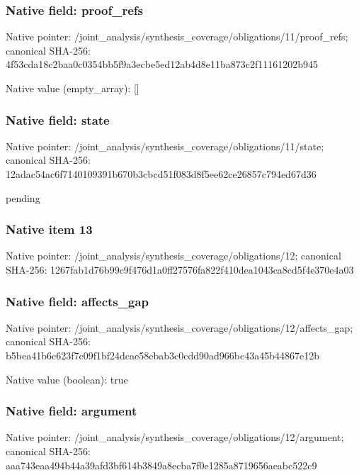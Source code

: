 \documentclass[10pt,a4paper]{article}
\begin{document}
\subsubsection{Native field: proof\_\allowbreak{}refs}
Native pointer: /joint\_\allowbreak{}analysis/synthesis\_\allowbreak{}coverage/obligations/11/proof\_\allowbreak{}refs; canonical SHA-256: 4f53cda18c2baa0c0354bb5f9a3ecbe5ed12ab4d8e11ba873c2f11161202b945

Native value (empty\_\allowbreak{}array): []

\subsubsection{Native field: state}
Native pointer: /joint\_\allowbreak{}analysis/synthesis\_\allowbreak{}coverage/obligations/11/state; canonical SHA-256: 12adac54ac6f7140109391b670b3cbcd51f083d8f5ee62ce26857c794ed67d36

\begingroup\raggedright\sloppy pending\par\endgroup

\subsubsection{Native item 13}
Native pointer: /joint\_\allowbreak{}analysis/synthesis\_\allowbreak{}coverage/obligations/12; canonical SHA-256: 1267fab1d76b99c9f476d1a0ff27576fa822f410dea1043ca8cd5f4e370e4a03

\subsubsection{Native field: affects\_\allowbreak{}gap}
Native pointer: /joint\_\allowbreak{}analysis/synthesis\_\allowbreak{}coverage/obligations/12/affects\_\allowbreak{}gap; canonical SHA-256: b5bea41b6c623f7c09f1bf24dcae58ebab3c0cdd90ad966bc43a45b44867e12b

Native value (boolean): true

\subsubsection{Native field: argument}
Native pointer: /joint\_\allowbreak{}analysis/synthesis\_\allowbreak{}coverage/obligations/12/argument; canonical SHA-256: aaa743eaa494b44a39afd3bf614b3849a8ecba7f0e1285a8719656aeabc522c9
\end{document}
